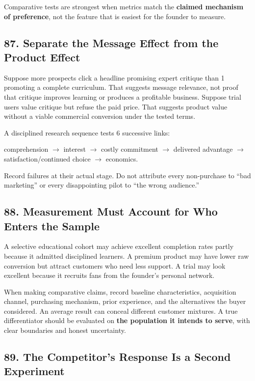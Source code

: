 Comparative tests are strongest when metrics match the \textbf{claimed mechanism of preference}, not the feature that is easiest for the founder to measure.

\subsection*{87. Separate the Message Effect from the Product Effect}

Suppose more prospects click a headline promising expert critique than 1 promoting a complete curriculum. That suggests message relevance, not proof that critique improves learning or produces a profitable business. Suppose trial users value critique but refuse the paid price. That suggests product value without a viable commercial conversion under the tested terms.

A disciplined research sequence tests 6 successive links:
\begin{center}
comprehension $\rightarrow$ interest $\rightarrow$ costly commitment $\rightarrow$ delivered advantage $\rightarrow$ satisfaction/continued choice $\rightarrow$ economics.
\end{center}

Record failures at their actual stage. Do not attribute every non-purchase to ``bad marketing'' or every disappointing pilot to ``the wrong audience.''

\subsection*{88. Measurement Must Account for Who Enters the Sample}

A selective educational cohort may achieve excellent completion rates partly because it admitted disciplined learners. A premium product may have lower raw conversion but attract customers who need less support. A trial may look excellent because it recruits fans from the founder's personal network.

When making comparative claims, record baseline characteristics, acquisition channel, purchasing mechanism, prior experience, and the alternatives the buyer considered. An average result can conceal different customer mixtures. A true differentiator should be evaluated on \textbf{the population it intends to serve}, with clear boundaries and honest uncertainty.

\subsection*{89. The Competitor's Response Is a Second Experiment}

